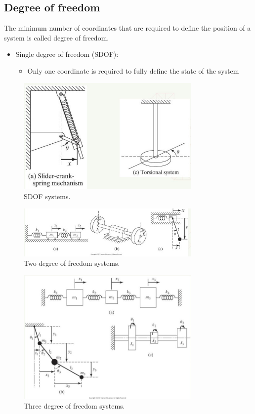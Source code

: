 \documentclass[class=report, crop=false, 12pt,a4paper]{standalone}
\begin{document}
\subsection{Degree of freedom}
The minimum number of coordinates that are required to define the position of a system is called degree of freedom. 
\begin{itemize}
    \item Single degree of freedom (SDOF):
    \begin{itemize}
        \item Only one coordinate is required to fully define the state of the system
    \end{itemize}
\end{itemize}
\begin{figure}[H]
    \centering
    \includegraphics[width = 0.8\textwidth]{../img/diagram3.jpg}
    \caption{SDOF systems.}
\end{figure}
\begin{figure}[H]
    \centering
    \includegraphics[width = 0.8\textwidth]{../img/diagram4.jpg}
    \caption{Two degree of freedom systems.}
\end{figure}
\begin{figure}[H]
    \centering
    \includegraphics[width = 0.8\textwidth]{../img/diagram5.jpg}
    \caption{Three degree of freedom systems.}
\end{figure}
\end{document}
